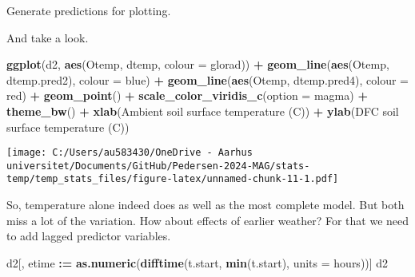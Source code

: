 \documentclass[
]{article}
\newenvironment{Shaded}{\begin{snugshade}}{\end{snugshade}}
\newcommand{\AttributeTok}[1]{\textcolor[rgb]{0.13,0.29,0.53}{#1}}
\newcommand{\FunctionTok}[1]{\textcolor[rgb]{0.13,0.29,0.53}{\textbf{#1}}}
\newcommand{\NormalTok}[1]{#1}
\newcommand{\OtherTok}[1]{\textcolor[rgb]{0.56,0.35,0.01}{#1}}
\newcommand{\SpecialCharTok}[1]{\textcolor[rgb]{0.81,0.36,0.00}{\textbf{#1}}}
\newcommand{\StringTok}[1]{\textcolor[rgb]{0.31,0.60,0.02}{#1}}
\begin{document}
Generate predictions for plotting.

\begin{Shaded}
\end{Shaded}

And take a look.

\begin{Shaded}
\begin{Highlighting}[]
\FunctionTok{ggplot}\NormalTok{(d2, }\FunctionTok{aes}\NormalTok{(Otemp, dtemp, }\AttributeTok{colour =}\NormalTok{ glorad)) }\SpecialCharTok{+} 
  \FunctionTok{geom\_line}\NormalTok{(}\FunctionTok{aes}\NormalTok{(Otemp, dtemp.pred2), }\AttributeTok{colour =} \StringTok{\textquotesingle{}blue\textquotesingle{}}\NormalTok{) }\SpecialCharTok{+} 
  \FunctionTok{geom\_line}\NormalTok{(}\FunctionTok{aes}\NormalTok{(Otemp, dtemp.pred4), }\AttributeTok{colour =} \StringTok{\textquotesingle{}red\textquotesingle{}}\NormalTok{) }\SpecialCharTok{+} 
  \FunctionTok{geom\_point}\NormalTok{() }\SpecialCharTok{+} 
  \FunctionTok{scale\_color\_viridis\_c}\NormalTok{(}\AttributeTok{option =} \StringTok{\textquotesingle{}magma\textquotesingle{}}\NormalTok{) }\SpecialCharTok{+}
  \FunctionTok{theme\_bw}\NormalTok{() }\SpecialCharTok{+}
  \FunctionTok{xlab}\NormalTok{(}\StringTok{\textquotesingle{}Ambient soil surface temperature (C)\textquotesingle{}}\NormalTok{) }\SpecialCharTok{+} \FunctionTok{ylab}\NormalTok{(}\StringTok{\textquotesingle{}DFC soil surface temperature (C)\textquotesingle{}}\NormalTok{)}
\end{Highlighting}
\end{Shaded}

\texttt{[image: C:/Users/au583430/OneDrive - Aarhus universitet/Documents/GitHub/Pedersen-2024-MAG/stats-temp/temp\_stats\_files/figure-latex/unnamed-chunk-11-1.pdf]}

So, temperature alone indeed does as well as the most complete model.
But both miss a lot of the variation. How about effects of earlier
weather? For that we need to add lagged predictor variables.

\begin{Shaded}
\begin{Highlighting}[]
\NormalTok{d2[, etime }\SpecialCharTok{:=} \FunctionTok{as.numeric}\NormalTok{(}\FunctionTok{difftime}\NormalTok{(t.start, }\FunctionTok{min}\NormalTok{(t.start), }\AttributeTok{units =} \StringTok{\textquotesingle{}hours\textquotesingle{}}\NormalTok{))]}
\NormalTok{d2}
\end{Highlighting}
\end{Shaded}
\end{document}
